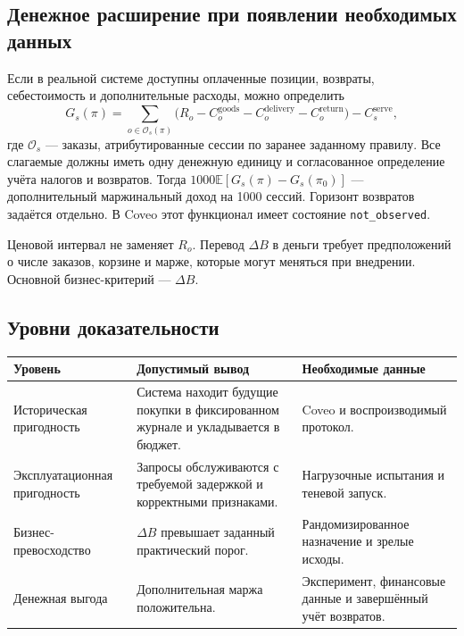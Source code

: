 \documentclass[12pt,a4paper]{article}
\newcommand{\code}[1]{{\ttfamily\small\nolinkurl{#1}}}
\newcommand{\E}{\mathbb E}
\theoremstyle{plainru}
\begin{document}
\subsection{Денежное расширение при появлении необходимых данных}

Если в реальной системе доступны оплаченные позиции, возвраты,
себестоимость и дополнительные расходы, можно определить
\begin{equation}\label{eq:business-margin}
G_s(\pi)=\sum_{o\in\mathcal O_s(\pi)}
\bigl(R_o-C_o^{\mathrm{goods}}-C_o^{\mathrm{delivery}}
-C_o^{\mathrm{return}}\bigr)-C_s^{\mathrm{serve}},
\end{equation}
где \(\mathcal O_s\) --- заказы, атрибутированные сессии по заранее
заданному правилу. Все слагаемые должны иметь одну денежную единицу
и согласованное определение учёта налогов и возвратов.
Тогда \(1000\E[G_s(\pi)-G_s(\pi_0)]\) --- дополнительный
маржинальный доход на 1000 сессий. Горизонт возвратов задаётся отдельно.
В Coveo этот функционал имеет состояние \code{not_observed}.

Ценовой интервал не заменяет \(R_o\). Перевод \(\Delta B\) в деньги
требует предположений о числе заказов, корзине и марже, которые могут
меняться при внедрении. Основной бизнес-критерий --- \(\Delta B\).

\subsection{Уровни доказательности}

\begin{longtable}{L{0.26\textwidth}L{0.32\textwidth}L{0.32\textwidth}}
\toprule Уровень & Допустимый вывод & Необходимые данные \\\midrule\endhead
Историческая пригодность & Система находит будущие покупки в фиксированном
журнале и укладывается в бюджет. & Coveo и воспроизводимый протокол. \\
Эксплуатационная пригодность & Запросы обслуживаются с требуемой задержкой
и корректными признаками. & Нагрузочные испытания и теневой запуск. \\
Бизнес-превосходство & \(\Delta B\) превышает заданный практический порог. &
Рандомизированное назначение и зрелые исходы. \\
Денежная выгода & Дополнительная маржа положительна. & Эксперимент,
финансовые данные и завершённый учёт возвратов. \\
\bottomrule
\end{longtable}
\end{document}
